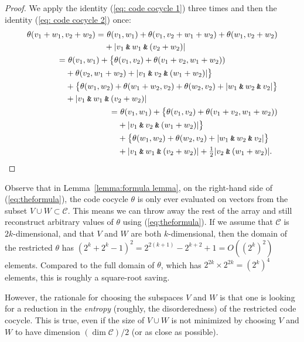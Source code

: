 \documentclass{article}
\theoremstyle{plain}
\theoremstyle{definition}
\def \cC {\mathcal{C}}
\newcommand{\AND}{\mathbin{\textup{\texttt{\&}}}}
\begin{document}
\begin{proof}
We apply the identity (\ref{eq: code cocycle 1}) three times and then the identity (\ref{eq: code cocycle 2}) once:
\begin{align*}
\begin{split}
	\theta(v_1+w_1,v_2+w_2) =&\ \theta(v_1,w_1) + \theta(v_1,v_2+w_1+w_2) + \theta(w_1,v_2+w_2) \\
	&+ |v_1\AND w_1\AND(v_2+w_2)| 
\end{split}\\
\begin{split}
	 =&\ \theta(v_1,w_1) + \big\{ \theta(v_1,v_2) + \theta(v_1+v_2,w_1+w_2)) \\ 
	 & + \theta(v_2,w_1+w_2) + |v_1\AND v_2 \AND (w_1+w_2)| \big\} \\
	 & + \big\{\theta(w_1,w_2) + \theta(w_1+w_2,v_2) + \theta(w_2,v_2) + |w_1\AND w_2\AND v_2| \big\} \\
	 & + |v_1\AND w_1\AND(v_2+w_2)| 
\end{split}\\
\begin{split}
	 =&\ \theta(v_1,w_1) + \big\{ \theta(v_1,v_2) + \theta(v_1+v_2,w_1+w_2)) \\ 
	 & +  |v_1\AND v_2 \AND (w_1+w_2)| \big\} \\
	 & + \big\{\theta(w_1,w_2) + \theta(w_2,v_2) + |w_1\AND w_2\AND v_2| \big\} \\
	 & + |v_1\AND w_1\AND(v_2+w_2)| + \tfrac12|v_2\AND (w_1+w_2)|. \qedhere
\end{split}
\end{align*}
\end{proof}



Observe that in Lemma~\ref{lemma:formula lemma}, on the right-hand side of (\ref{eq:theformula}), the code cocycle $\theta$ is only ever evaluated on vectors from the subset $V \cup W \subset \cC$.
This means we can throw away the rest of the array and still reconstruct arbitrary values of $\theta$ using (\ref{eq:theformula}).
If we assume that $\cC$ is $2k$-dimensional, and that $V$ and $W$ are both $k$-dimensional, then the domain of the restricted $\theta$ has $(2^k+2^k - 1)^2 = 2^{2(k+1)} - 2^{k+2} + 1 = O((2^k)^2)$ elements. 
Compared to the full domain of $\theta$, which has $2^{2k}\times 2^{2k} = (2^k)^4$ elements, this is roughly a square-root saving.

However, the rationale for choosing the subspaces $V$ and $W$ is that one is looking for a reduction in the \emph{entropy} (roughly, the disorderedness) of the restricted code cocycle. 
This is true, even if the size of $V\cup W$ is not minimized by choosing $V$ and $W$ to have dimension $(\dim\cC)/2$ (or as close as possible).
\end{document}
